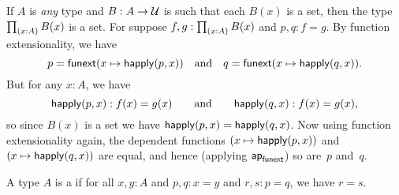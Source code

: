 \documentclass[hott-all.tex]{subfiles}
\begin{document}
\begin{eg}
  If $A$ is \emph{any} type and $B:A\to \mathcal{U}$ is such that each $B(x)$ is a set, then the type $\prd{x:A} B(x)$ is a set.
  For suppose $f,g:\prd{x:A} B(x)$ and $p,q:f=g$.
  By function extensionality, we have
  \begin{equation*}
    p = {\mathsf{funext} (x \mapsto \mathsf{happly}(p,x))}
    \quad\text{and}\quad
    q = {\mathsf{funext} (x \mapsto \mathsf{happly}(q,x))}.
  \end{equation*}
  But for any $x:A$, we have
  \begin{equation*}
   \mathsf{happly}(p,x):f(x)=g(x)
   \qquad\text{and}\qquad
   \mathsf{happly}(q,x):f(x)=g(x),
  \end{equation*}
  so since $B(x)$ is a set we have $\mathsf{happly}(p,x) = \mathsf{happly}(q,x)$.
  Now using function extensionality again, the dependent functions $(x \mapsto \mathsf{happly}(p,x))$ and $(x \mapsto \mathsf{happly}(q,x))$ are equal, and hence (applying $\mathsf{ap}_{\mathsf{funext}}$) so are~$p$ and~$q$.
\end{eg}
%
%
%

\begin{defn}
  A type $A$ is a 
  if for all $x,y:A$ and $p,q:x=y$ and $r,s:p=q$, we have $r=s$.
\end{defn}
%
%
\end{document}

